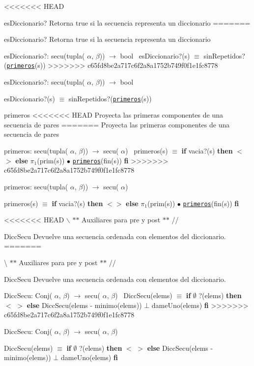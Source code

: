 <<<<<<< HEAD
\begin{DoxyParagraph}{es\-Diccionario?}
\-Retorna true si la secuencia representa un diccionario
=======
\begin{DoxyParagraph}{es\+Diccionario?}
Retorna true si la secuencia representa un diccionario

es\+Diccionario?\+: secu(tupla( $\alpha$, $\beta$)) $\to$ bool~\newline
es\+Diccionario?(s) $\equiv$ sin\+Repetidos?(\href{axiomas.html#primeros}{\tt primeros}(s)) 
>>>>>>> c65fd8be2a717c6f2a8a1752b749f0f1e1fc8778
\end{DoxyParagraph}
es\-Diccionario?\-: secu(tupla( $\alpha$, $\beta$)) $\to$ bool\par
 es\-Diccionario?(s) $\equiv$ sin\-Repetidos?(\href{axiomas.html#primeros}{\tt primeros}(s)) 

\begin{DoxyParagraph}{primeros}
<<<<<<< HEAD
\-Proyecta las primeras componentes de una secuencia de pares
=======
Proyecta las primeras componentes de una secuencia de pares

primeros\+: secu(tupla( $\alpha$, $\beta$)) $\to$ secu( $\alpha$)~\newline
primeros(s) $\equiv$ {\bfseries if} vacia?(s) {\bfseries then} $<$$>$ {\bfseries else} $\pi_1$(prim(s)) $\bullet$ \href{axiomas.html#primeros}{\tt primeros}(fin(s)) {\bfseries fi} 
>>>>>>> c65fd8be2a717c6f2a8a1752b749f0f1e1fc8778
\end{DoxyParagraph}
primeros\-: secu(tupla( $\alpha$, $\beta$)) $\to$ secu( $\alpha$)\par
 primeros(s) $\equiv$ {\bfseries if} vacia?(s) {\bfseries then} $<$$>$ {\bfseries else} $\pi_1$(prim(s)) $\bullet$ \href{axiomas.html#primeros}{\tt primeros}(fin(s)) {\bfseries fi} 

<<<<<<< HEAD
$\backslash$ $\ast$$\ast$ \-Auxiliares para pre y post $\ast$$\ast$ // \begin{DoxyParagraph}{\-Dicc\-Secu}
\-Devuelve una secuencia ordenada con elementos del diccionario.
=======

\textbackslash{} $\ast$$\ast$ Auxiliares para pre y post $\ast$$\ast$ // \begin{DoxyParagraph}{Dicc\+Secu}
Devuelve una secuencia ordenada con elementos del diccionario.

Dicc\+Secu\+: Conj( $\alpha$, $\beta$) $\to$ secu( $\alpha$, $\beta$)~\newline
Dicc\+Secu(elems) $\equiv$ {\bfseries if} $\emptyset$ ?(elems) {\bfseries then} $<$ $>$ {\bfseries else} Dicc\+Secu(elems -\/ minimo(elems)) $\bot$ dame\+Uno(elems) {\bfseries fi} 
>>>>>>> c65fd8be2a717c6f2a8a1752b749f0f1e1fc8778
\end{DoxyParagraph}
\-Dicc\-Secu\-: \-Conj( $\alpha$, $\beta$) $\to$ secu( $\alpha$, $\beta$)\par
 \-Dicc\-Secu(elems) $\equiv$ {\bfseries if} $\emptyset$ ?(elems) {\bfseries then} $<$ $>$ {\bfseries else} \-Dicc\-Secu(elems -\/ minimo(elems)) $\bot$ dame\-Uno(elems) {\bfseries fi} 


\end{DoxyParagraph}
\end{DoxyParagraph}
